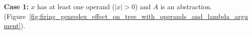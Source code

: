 \documentclass{elsarticle}
\newif\iflongversion
\theoremstyle{plain}
\theoremstyle{definition}
\newcommand{\enables}{\vdash} %
\begin{document}
%
{\bf Case 1:} $x$ has at least one operand ($|x|>0$) and $A$ is an
abstraction.
\iflongversion
    (Figure~\ref{fig:firing_genredex_effect_on_tree_with_operands_and_lambda_argument}).
\end{document}
